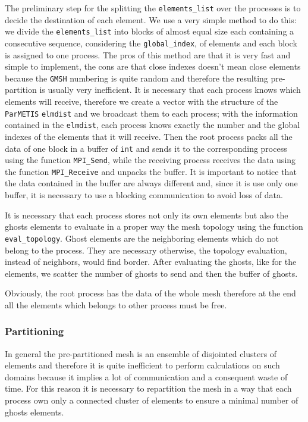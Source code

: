 The preliminary step for the splitting the \verb|elements_list| over the processes is to decide the destination of each element. We use a very simple method to do this: we divide the \verb|elements_list| into blocks of almost equal size each containing a consecutive sequence, considering the \verb|global_index|, of elements and each block is assigned to one process. The pros of this method are that it is very fast and simple to implement, the cons are that close indexes doesn't mean close elements because the \verb|GMSH| numbering is quite random and therefore the resulting pre-partition is usually very inefficient. It is necessary that each process knows which elements will receive, therefore we create a vector with the structure of the \verb|ParMETIS| \verb|elmdist| and we broadcast them to each process; with the information contained in the \verb|elmdist|, each process knows exactly the number and the global indexes of the elements that it will receive. Then the root process packs all the data of one
block in a buffer of \verb|int| and sends it to the corresponding process using the function \verb|MPI_Send|, while the receiving process receives the data using the function \verb|MPI_Receive| and unpacks the buffer. It is important to notice that the data contained in the buffer are always different and, since it is use only one buffer, it is necessary to use a blocking communication to avoid loss of data.
\medskip

It is necessary that each process stores not only its own elements but also the ghosts elements to evaluate in a proper way the mesh topology using the function \verb|eval_topology|. Ghost elements are the neighboring elements which do not belong to the process. They are necessary otherwise, the topology evaluation, instead of neighbors, would find border. After evaluating the ghosts, like for the elements, we scatter the number of ghosts to send and then the buffer of ghosts.
\medskip

Obviously, the root process has the data of the whole mesh therefore at the end all the elements which belongs to other process must be free.

\subsubsection{Partitioning}
In general the pre-partitioned mesh is an ensemble of disjointed clusters of elements and therefore it is quite inefficient to perform calculations on such domains because it implies a lot of communication and a consequent waste of time. For this reason it is necessary to repartition the mesh in a way that each process own only a connected cluster of elements to ensure a minimal number of ghosts elements.

